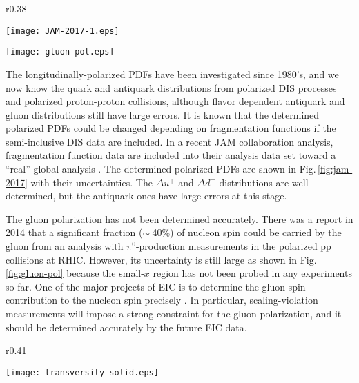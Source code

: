 \documentclass{PoS}
\begin{document}
\begin{wrapfigure}[22]{r}{0.38\textwidth}
   \vspace{-0.7cm} 
   \begin{center}
     \texttt{[image: JAM-2017-1.eps]}
\vspace{-0.80cm}
\caption{Polarized PDFs of nucleon \cite{jam-2017}.}
\label{fig:jam-2017}
\vspace{+0.60cm}
     \texttt{[image: gluon-pol.eps]}
\vspace{-0.40cm}
\caption{Gluon polarization at EIC \cite{eic-2016}.}
\label{fig:gluon-pol}
\end{center}
\end{wrapfigure}

The longitudinally-polarized PDFs have been investigated 
since 1980's, and we now know the quark and antiquark distributions
from polarized DIS processes and polarized proton-proton collisions,
although flavor dependent antiquark and 
gluon distributions still have large errors. 
It is known that the determined polarized PDFs could 
be changed depending on fragmentation functions if the semi-inclusive DIS
data are included. In a recent JAM collaboration analysis,
fragmentation function data are included into their analysis 
data set toward a ``real'' global analysis \cite{jam-2017}.
The determined polarized PDFs are shown in Fig.\,\ref{fig:jam-2017}
with their uncertainties. The $\Delta u^+$ and $\Delta d^+$ distributions
are well determined, but the antiquark ones have large errors at this stage.

The gluon polarization has not been determined accurately.
There was a report in 2014 that a significant fraction
($\sim\ $40\%) of nucleon spin could be carried by the gluon
from an analysis with $\pi^0$-production measurements 
in the polarized pp collisions at RHIC. However, its uncertainty
is still large as shown in Fig.\,\ref{fig:gluon-pol} because
the small-$x$ region has not been probed in any experiments so far.
One of the major projects of EIC is to determine the gluon-spin
contribution to the nucleon spin precisely \cite{eic-2016}.
In particular, scaling-violation measurements will impose
a strong constraint for the gluon polarization, and 
it should be determined accurately by the future EIC data.

\begin{wrapfigure}[10]{r}{0.41\textwidth}
   \vspace{-0.7cm} 
   \begin{center}
     \texttt{[image: transversity-solid.eps]}
\vspace{-0.40cm}
\caption{Transversity and SoLID \cite{trans-solid-2017}.}
\label{fig:trans-solid}
\end{center}
\end{wrapfigure}
\end{document}
